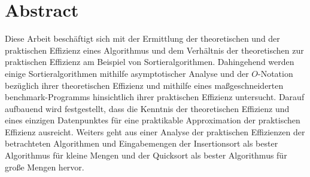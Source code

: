 \chapter*{Abstract}
\label{cha:abstract}

Diese Arbeit beschäftigt sich mit der Ermittlung der theoretischen und der praktischen Effizienz eines Algorithmus und dem Verhältnis der theoretischen zur praktischen Effizienz am Beispiel von Sortieralgorithmen. Dahingehend werden einige Sortieralgorithmen mithilfe asymptotischer Analyse und der $O$-Notation bezüglich ihrer theoretischen Effizienz und mithilfe eines maßgeschneiderten benchmark-Programms hinsichtlich ihrer praktischen Effizienz untersucht. Darauf aufbauend wird festgestellt, dass die Kenntnis der theoretischen Effizienz und eines einzigen Datenpunktes für eine praktikable Approximation der praktischen Effizienz ausreicht. Weiters geht aus einer Analyse der praktischen Effizienzen der betrachteten Algorithmen und Eingabemengen der Insertionsort als bester Algorithmus für kleine Mengen und der Quicksort als bester Algorithmus für große Mengen hervor.
